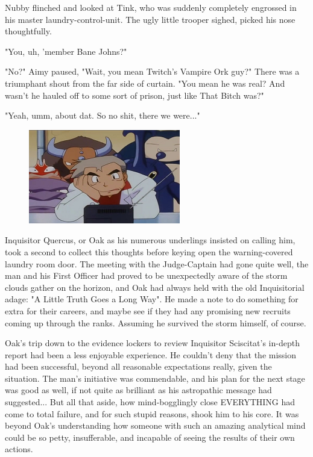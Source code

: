 Nubby flinched and looked at Tink, who was suddenly completely engrossed in his master laundry-control-unit. 
The ugly little trooper sighed, picked his nose thoughtfully.

"You, uh, 'member Bane Johns?"

"No?" Aimy paused, "Wait, you mean Twitch's Vampire Ork guy?" There was a triumphant shout from the far side of curtain. 
"You mean he was real? 
And wasn't he hauled off to some sort of prison, just like That Bitch was?"

"Yeah, umm, about dat. 
So no shit, there we were..."


\begin{figure}
	\begin{center}
		\includegraphics[width=\figwidth]{pics/20/16.png}
	\end{center}
\end{figure}

Inquisitor Quercus, or Oak as his numerous underlings insisted on calling him, took a second to collect this thoughts before keying open the warning-covered laundry room door. 
The meeting with the Judge-Captain had gone quite well, the man and his First Officer had proved to be unexpectedly aware of the storm clouds gather on the horizon, and Oak had always held with the old Inquisitorial adage: 
"A Little Truth Goes a Long Way". 
He made a note to do something for extra for their careers, and maybe see if they had any promising new recruits coming up through the ranks. 
Assuming he survived the storm himself, of course.

Oak's trip down to the evidence lockers to review Inquisitor Sciscitat's in-depth report had been a less enjoyable experience. 
He couldn't deny that the mission had been successful, beyond all reasonable expectations really, given the situation. 
The man's initiative was commendable, and his plan for the next stage was good as well, if not quite as brilliant as his astropathic message had suggested... 
But all that aside, how mind-bogglingly close EVERYTHING had come to total failure, and for such stupid reasons, shook him to his core. 
It was beyond Oak's understanding how someone with such an amazing analytical mind could be so petty, insufferable, and incapable of seeing the results of their own actions. 


